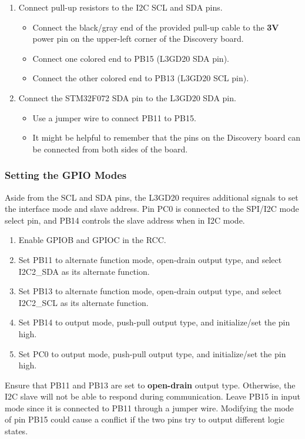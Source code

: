 \documentclass[openany,11pt,fleqn]{book} %
\begin{document}
\begin{enumerate}
    \item Connect pull-up resistors to the I2C SCL and SDA pins. 
    \begin{itemize}
        \item Connect the black/gray end of the provided pull-up cable to the \textbf{3V} power pin on the upper-left corner of the Discovery board.
        \item Connect one colored end to PB15 (L3GD20 SDA pin).
        \item Connect the other colored end to PB13 (L3GD20 SCL pin).
    \end{itemize}
    \item Connect the STM32F072 SDA pin to the L3GD20 SDA pin.
    \begin{itemize}
        \item Use a jumper wire to connect PB11 to PB15.
        \item It might be helpful to remember that the pins on the Discovery board can be connected from both sides of the board. 
    \end{itemize}
\end{enumerate}

\subsubsection{Setting the GPIO Modes}
Aside from the SCL and SDA pins, the L3GD20 requires additional signals to set the interface mode and slave address. Pin PC0 is connected to the SPI/I2C mode select pin, and PB14 controls the slave address when in I2C mode. 

\begin{enumerate}
    \item Enable GPIOB and GPIOC in the RCC. 
    \item Set PB11 to alternate function mode, open-drain output type, and select I2C2\_SDA as its alternate function.
    \item Set PB13 to alternate function mode, open-drain output type, and select I2C2\_SCL as its alternate function.
    \item Set PB14 to output mode, push-pull output type, and initialize/set the pin high.
    \item Set PC0 to output mode, push-pull output type, and initialize/set the pin high.
\end{enumerate}

\begin{warning}
    Ensure that PB11 and PB13 are set to \textbf{open-drain} output type. Otherwise, the I2C slave will not be able to respond during communication. Leave PB15 in input mode since it is connected to PB11 through a jumper wire. Modifying the mode of pin PB15 could cause a conflict if the two pins try to output different logic states. 
\end{warning}
\end{document}

